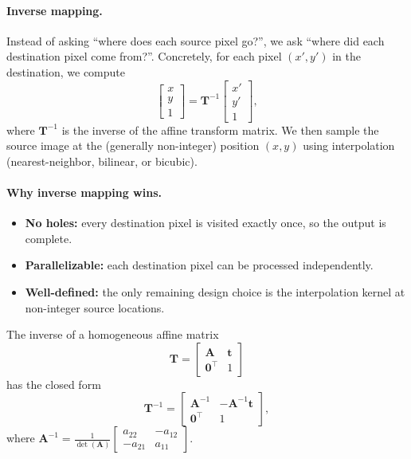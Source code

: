 \paragraph{Inverse mapping.}
Instead of asking ``where does each source pixel go?'', we ask ``where did each destination pixel come from?''.  Concretely, for each pixel $(x', y')$ in the destination, we compute
\[
    \begin{bmatrix} x \\ y \\ 1 \end{bmatrix}
    = \mathbf{T}^{-1}
    \begin{bmatrix} x' \\ y' \\ 1 \end{bmatrix},
\]
where $\mathbf{T}^{-1}$ is the inverse of the affine transform matrix.  We then sample the source image at the (generally non-integer) position $(x, y)$ using interpolation (nearest-neighbor, bilinear, or bicubic).

\paragraph{Why inverse mapping wins.}
\begin{itemize}
    \item \textbf{No holes:} every destination pixel is visited exactly once, so the output is complete.
    \item \textbf{Parallelizable:} each destination pixel can be processed independently.
    \item \textbf{Well-defined:} the only remaining design choice is the interpolation kernel at non-integer source locations.
\end{itemize}

The inverse of a homogeneous affine matrix
\[
    \mathbf{T} =
    \begin{bmatrix}
        \mathbf{A} & \mathbf{t} \\
        \mathbf{0}^\top & 1
    \end{bmatrix}
\]
has the closed form
\[
    \mathbf{T}^{-1} =
    \begin{bmatrix}
        \mathbf{A}^{-1} & -\mathbf{A}^{-1}\mathbf{t} \\
        \mathbf{0}^\top & 1
    \end{bmatrix},
\]
where $\mathbf{A}^{-1} = \frac{1}{\det(\mathbf{A})}
\begin{bmatrix}
    a_{22} & -a_{12} \\
    -a_{21} & a_{11}
\end{bmatrix}$.

